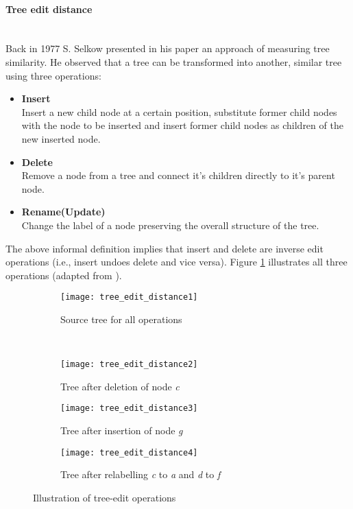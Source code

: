 \documentclass[12pt, notitlepage]{article}
\begin{document}
\paragraph{Tree edit distance} ~\\
Back in 1977 S. Selkow presented in his paper\cite{tree-editing-distance} an approach of measuring tree similarity. He observed that a tree can be transformed into another, similar tree 
using three operations:
\begin{itemize}
	\item \textbf{Insert}\\
	Insert a new child node at a certain position, substitute former child nodes with the node to be inserted and insert former child nodes as children of the new inserted node.  
	\item \textbf{Delete}\\
	Remove a node from a tree and connect it's children directly to it's parent node.
	\item \textbf{Rename(Update)}\\
	Change the label of a node preserving the overall structure of the tree.
\end{itemize}
The above informal definition implies that insert and delete are inverse edit operations (i.e., insert undoes delete and vice versa). Figure \ref{fig:tree_operations} illustrates all three operations (adapted from \cite{tree-edit-distance-survey}). 
\begin{figure}[H]
        \centering
        \begin{subfigure}[h!]{0.3\textwidth}
                \texttt{[image: tree\_edit\_distance1]}
                \caption{Source tree for all operations}
        \end{subfigure}
\\
        \begin{subfigure}[h!]{0.3\textwidth}
                \texttt{[image: tree\_edit\_distance2]}
                \caption{Tree after deletion of node \textit{c}}
        \end{subfigure}
\quad
        \begin{subfigure}[h!]{0.3\textwidth}
                \texttt{[image: tree\_edit\_distance3]}
                \caption{Tree after insertion of node \textit{g}}
        \end{subfigure}
\quad
        \begin{subfigure}[h!]{0.3\textwidth}
                \texttt{[image: tree\_edit\_distance4]}
                \caption{Tree after relabelling \textit{c} to \textit{a} and \textit{d} to \textit{f}}
        \end{subfigure}
        \caption{Illustration of tree-edit operations}\label{fig:tree_operations}
\end{figure}
\end{document}
